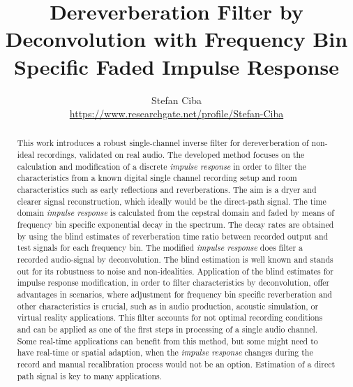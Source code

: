 \documentclass{article}
\title{Dereverberation Filter by Deconvolution with Frequency Bin Specific Faded Impulse Response
}
\author{Stefan Ciba \\ \href{https://www.researchgate.net/profile/Stefan-Ciba}{https://www.researchgate.net/profile/Stefan-Ciba}
}
\begin{document}
\maketitle

\begin{abstract} 
This work introduces a robust single-channel inverse filter for dereverberation of non-ideal recordings, validated on real audio.
The developed method focuses on the calculation and modification of a discrete \textit{impulse response} in order to filter the characteristics from a known digital single channel recording setup and room characteristics such as early reflections and reverberations. The aim is a dryer and clearer signal reconstruction, which ideally would be the direct-path signal. The time domain \textit{impulse response} is calculated from the cepstral domain and faded by means of frequency bin specific exponential decay in the spectrum. The decay rates are obtained by using the blind estimates of reverberation time ratio between recorded output and test signals for each frequency bin. The modified \textit{impulse response} does filter a recorded audio-signal by deconvolution. The blind estimation is well known and stands out for its robustness to noise and non-idealities.
Application of the blind estimates for impulse response modification, in order to filter characteristics by deconvolution, offer advantages in scenarios, where adjustment for frequency bin specific reverberation and other characteristics is crucial, such as in audio production, acoustic simulation, or virtual reality applications. %
This filter accounts for not optimal recording conditions and can be applied as one of the first steps in processing of a single audio channel. Some real-time applications can benefit from this method, but some might need to have real-time or spatial adaption, when the \textit{impulse response} changes during the record and manual recalibration process would not be an option. %
Estimation of a direct path signal is key to many applications. %
\end{abstract}
\end{document}
